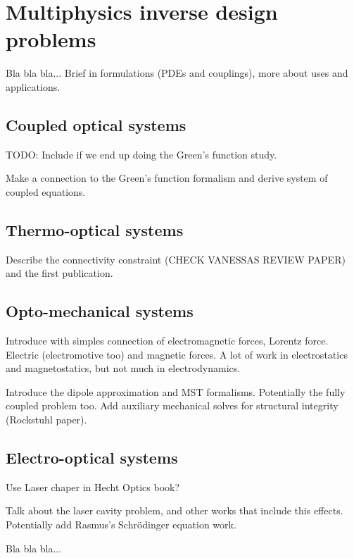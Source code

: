 \chapter{Multiphysics inverse design problems}

Bla bla bla... Brief in formulations (PDEs and couplings), more about uses and applications.






\section{Coupled optical systems}

TODO: Include if we end up doing the Green's function study.

 Make a connection to the Green's function formalism and derive system of coupled equations.

\section{Thermo-optical systems}

Describe the connectivity constraint (CHECK VANESSAS REVIEW PAPER) and the first publication.

\section{Opto-mechanical systems}

Introduce with simples connection of electromagnetic forces, Lorentz force. Electric (electromotive too) and 
magnetic forces. A lot of work in electrostatics and magnetostatics, but not much in
electrodynamics.

Introduce the dipole approximation and MST formalisms. Potentially the fully coupled problem too.
Add auxiliary mechanical solves for structural integrity (Rockstuhl paper).

\section{Electro-optical systems}

Use Laser chaper in Hecht Optics book?

Talk about the laser cavity problem, and other works that include this effects.
Potentially add Rasmus's Schrödinger equation work.

Bla bla bla...